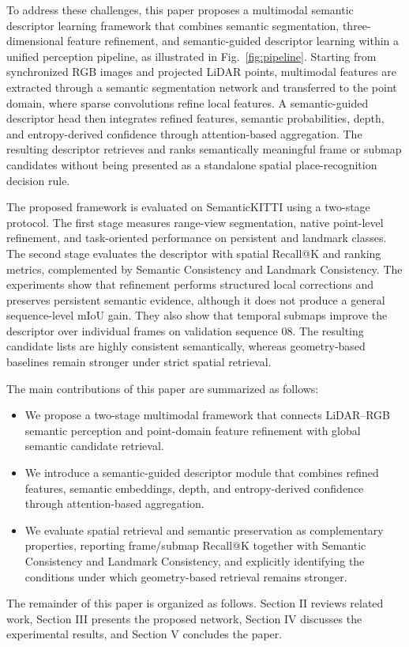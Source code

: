 To address these challenges, this paper proposes a multimodal semantic descriptor learning framework that combines semantic segmentation, three-dimensional feature refinement, and semantic-guided descriptor learning within a unified perception pipeline, as illustrated in Fig.~\ref{fig:pipeline}. Starting from synchronized RGB images and projected LiDAR points, multimodal features are extracted through a semantic segmentation network and transferred to the point domain, where sparse convolutions refine local features. A semantic-guided descriptor head then integrates refined features, semantic probabilities, depth, and entropy-derived confidence through attention-based aggregation. The resulting descriptor retrieves and ranks semantically meaningful frame or submap candidates without being presented as a standalone spatial place-recognition decision rule.

The proposed framework is evaluated on SemanticKITTI using a two-stage protocol. The first stage measures range-view segmentation, native point-level refinement, and task-oriented performance on persistent and landmark classes. The second stage evaluates the descriptor with spatial Recall@K and ranking metrics, complemented by Semantic Consistency and Landmark Consistency. The experiments show that refinement performs structured local corrections and preserves persistent semantic evidence, although it does not produce a general sequence-level mIoU gain. They also show that temporal submaps improve the descriptor over individual frames on validation sequence 08. The resulting candidate lists are highly consistent semantically, whereas geometry-based baselines remain stronger under strict spatial retrieval.

The main contributions of this paper are summarized as follows:

	\begin{itemize}
	\item We propose a two-stage multimodal framework that connects LiDAR--RGB semantic perception and point-domain feature refinement with global semantic candidate retrieval.
	\item We introduce a semantic-guided descriptor module that combines refined features, semantic embeddings, depth, and entropy-derived confidence through attention-based aggregation.
	\item We evaluate spatial retrieval and semantic preservation as complementary properties, reporting frame/submap Recall@K together with Semantic Consistency and Landmark Consistency, and explicitly identifying the conditions under which geometry-based retrieval remains stronger.
\end{itemize}

The remainder of this paper is organized as follows. Section II reviews related work, Section III presents the proposed network, Section IV discusses the experimental results, and Section V concludes the paper.
